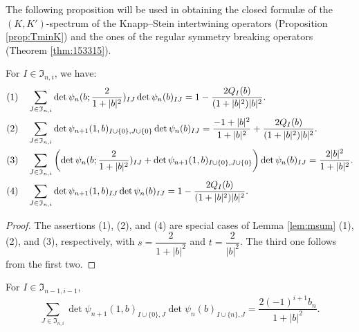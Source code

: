 The following proposition 
 will be used in obtaining the closed formul{\ae}
 of the $(K,K')$-spectrum
 of the Knapp--Stein intertwining operators (Proposition \ref{prop:TminK})
 and the ones of the regular symmetry breaking operators
 (Theorem \ref{thm:153315}).  
\begin{proposition}
\label{prop:msum}
For $I \in {\mathfrak{I}}_{n,i}$, 
we have:
\begin{alignat}{2}
&\text{\rm{(1)}}
&&\sum_{J \in {\mathfrak{I}}_{n,i}}
\det \psi_n(b;\frac{2}{1+|b|^2})_{I J}
\det \psi_n(b)_{I J}
=
1- \frac{2 Q_I(b)}{(1+|b|^2) |b|^2}.  
\notag
\\
&\text{\rm{(2)}}
&&\sum_{J \in {\mathfrak{I}}_{n,i}}
\det \psi_{n+1}(1,b)_{I\cup \{0\},  J\cup \{0\}}
\det \psi_n(b)_{I J}
=
\frac{-1+|b|^2}{1+|b|^2} + \frac{2 Q_I(b)}{(1+|b|^2) |b|^2}.  
\notag
\\
&\text{\rm{(3)}}
&&\sum_{J \in {\mathfrak{I}}_{n,i}}
\left(\det \psi_n(b;\frac{2}{1+|b|^2})_{I J}
+
\det \psi_{n+1}(1,b)_{I\cup \{0\},  J\cup \{0\}}
\right)
\det \psi_n(b)_{I J}
=
\frac{2 |b|^2}{1+|b|^2}.  
\notag
\\
\label{eqn:kbsum}
&\text{\rm{(4)}}
&&\sum_{J \in {\mathfrak{I}}_{n,i}} \det \psi_{n+1}(1,b)_{I J}
\det \psi_n(b)_{I J}
=
1-\frac{2Q_I(b)}{(1+|b|^2)|b|^2}.  
\end{alignat}
\end{proposition}

\begin{proof}
The assertions (1), (2), and (4) are special cases
 of Lemma \ref{lem:msum} (1), (2), and (3), 
 respectively,
 with $s = \dfrac{2}{1+|b|^2}$ and $t=\dfrac {2}{|b|^2}$.  
The third one follows from the first two.  
\end{proof}

\begin{lemma}
\label{lem:S0n}
For $I \in {\mathfrak{I}}_{n-1,i-1}$, 
\[
  \sum_{J \in {\mathfrak{I}}_{n,i}}
  \det \psi_{n+1}(1,b)_{I \cup \{0\},  J}
  \det \psi_{n}(b)_{I \cup \{n\},  J}
  =
  \frac{2(-1)^{i+1} b_n}{1+|b|^2}.  
\]
\end{lemma}

